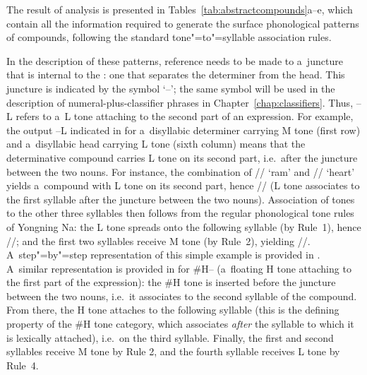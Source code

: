 The result of analysis is presented in Tables~\ref{tab:abstractcompounds}a--e, which contain all the information
required to generate the surface phonological patterns of compounds, following the standard tone"=to"=syllable association
rules.

In the description of these patterns, reference needs to be made to a~juncture that is internal to the
: one that separates the determiner from the head. This juncture is indicated by the
symbol ‘--’; the same symbol will be used in the description of numeral-plus-classifier phrases in Chapter~\ref{chap:classifiers}. Thus, --L refers to a~L tone attaching to the second part of an expression. 
For example, the output --L indicated in  for a~disyllabic determiner carrying M tone (first row) and a~disyllabic head carrying L tone (sixth column) means that the determinative compound carries L tone on its second part, i.e.\ after the juncture between the two nouns. For instance, the combination of // ‘ram’ and // ‘heart’ yields a~compound with L tone on its second part, hence // (L tone associates to the first syllable after the juncture between the two nouns). Association of tones to the other three syllables then follows from the regular phonological tone rules of Yongning Na: the L tone spreads onto the following syllable (by Rule~1), hence //; and the first two syllables receive M tone (by Rule~2), yielding //. A~step"=by"=step representation of this simple example is provided in . A~similar representation is provided in  for \#H-- (a~floating H tone attaching to the first part of the expression): the \#H tone is inserted before the juncture between the two nouns, i.e.\ it associates to the second syllable of the compound. From there, the H tone attaches to the following syllable (this is the defining property of the \#H tone category, which associates \textit{after} the syllable to which it is lexically attached), i.e.\ on the third syllable. Finally, the first and second syllables receive M tone by Rule 2, and the fourth syllable receives L tone by Rule~4. 

